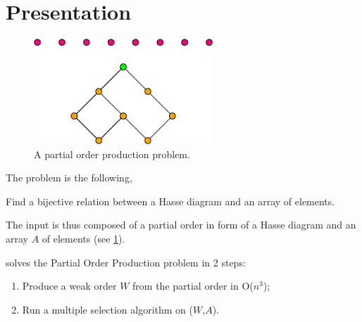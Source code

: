 \section{Presentation}
\label{tree:pop:presentation}

\begin{figure}
	\centering
	\includegraphics[width=0.6\textwidth]{fig/pop:diag}
	\caption{\label{fig:pop:diag} A partial order production problem.}
\end{figure}

The problem is the following,

Find a bijective relation between a Hasse diagram and an array of elements.

The input is thus composed of a partial order in form of a Hasse diagram and an array $A$ of elements (see \ref{fig:pop:diag}).

\cite{jcardin1} solves the Partial Order Production problem in 2 steps:

\begin{enumerate}
\item Produce a weak order $W$ from the partial order in O($n^3$);
\item Run a multiple selection algorithm on ($W$,$A$).
\end{enumerate}